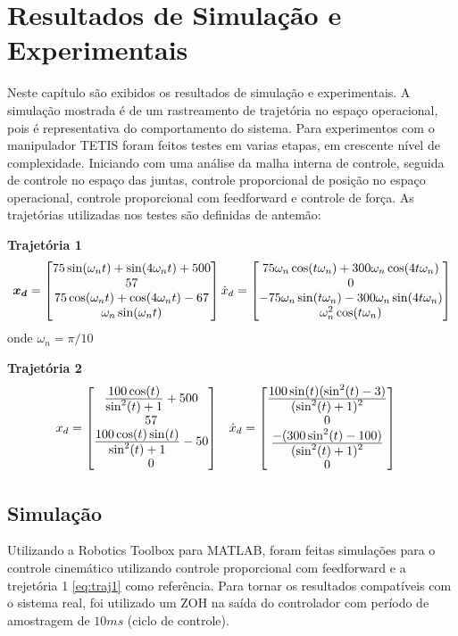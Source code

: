 \chapter{Resultados de Simulação e Experimentais}

Neste capítulo são exibidos os resultados de simulação e experimentais. A simulação mostrada é de um rastreamento de trajetória no espaço operacional, pois é representativa do comportamento do sistema. Para experimentos com o manipulador TETIS foram feitos testes em varias etapas, em crescente nível de complexidade. Iniciando com uma análise da malha interna de controle, seguida de controle no espaço das juntas, controle proporcional de posição no espaço operacional, controle proporcional com feedforward e controle de força. As trajetórias utilizadas nos testes são definidas de antemão:

\textbf{Trajetória 1}
\begin{gather} \label{eq:traj1}
\bm{x_d} = \begin{bmatrix}75 \sin(\omega_n t) + \sin (4 \omega_n t) + 500 \\ 57 \\ 75 \cos(\omega_n t) + \cos(4\omega_n t) -67 \\ \omega_n \sin(\omega_nt) \end{bmatrix}
{\dot{x}_d} = \begin{bmatrix}75\omega_n \cos(t\omega_n) + 300 \omega_n \cos(4t\omega_n) \\
0 \\
-75 \omega_n \sin(t \omega_n) - 300 \omega_n \sin(4t\omega_n) \\
\omega_n^2 \cos(t \omega_n)\end{bmatrix}
\end{gather}
onde $\omega_n = \pi/10$

\textbf{Trajetória 2} 
\begin{align} \label{eq:traj2}
{x_d} &= \begin{bmatrix} 
\frac{\displaystyle 100 \cos(t)}{\displaystyle \sin^2(t) + 1} + 500 \\
57 \\
\frac{\displaystyle 100\cos(t) \sin(t)}{\displaystyle \sin^2(t) + 1} -50 \\
0
\end{bmatrix} &&
{\dot{x}_d} = \begin{bmatrix}
\frac{\displaystyle 100\sin(t) (\sin^2(t) -3 )}{\displaystyle (\sin^2(t) + 1)^2} \\
0 \\
\frac{\displaystyle -(300 \sin^2(t) - 100)}{\displaystyle (\sin^2(t) + 1)^2} \\
0\end{bmatrix}
\end{align}

\section{Simulação}
Utilizando a Robotics Toolbox \citep{petercorke} para MATLAB\circledR, foram feitas simulações para o controle cinemático utilizando controle proporcional com feedforward e a trejetória 1 \eqref{eq:traj1} como referência. Para tornar os resultados compatíveis com o sistema real, foi utilizado um ZOH na saída do controlador com período de amostragem de $10ms$ (ciclo de controle).

